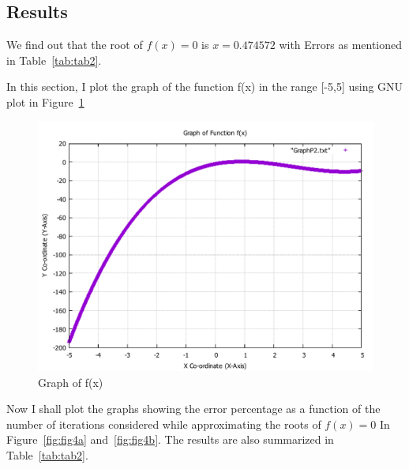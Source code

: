 \documentclass[titlepage, 11pt]{article}
\begin{document}
\subsection{Results}

We find out that the root of $f(x)=0$ is $x=0.474572$ with Errors as mentioned in Table~\ref{tab:tab2}.

In this section, I plot the graph of the function f(x) in the range [-5,5] using GNU plot in Figure~\ref{fig:3}
\begin{figure}
  \centering
    \includegraphics[width=\linewidth]{GraphP2.pdf}
    \caption{Graph of f(x)}
    \label{fig:3}
\end{figure}

Now I shall plot the graphs showing the error percentage as a function of the number of iterations considered while approximating the roots of $f(x)=0$ In Figure~\ref{fig:fig4a} and~\ref{fig:fig4b}. The results are also summarized in Table~\ref{tab:tab2}.
\end{document}

